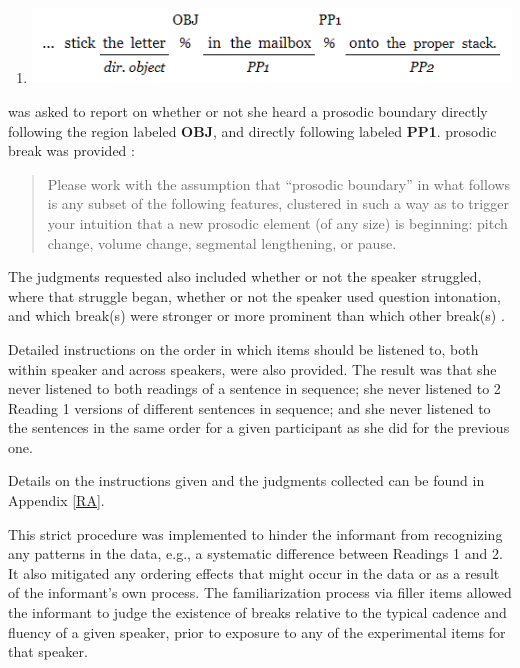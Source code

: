 \documentclass[12pt,oneside]{book}
\providecommand{\tightlist}{%
  \setlength{\itemsep}{0pt}\setlength{\parskip}{0pt}}
\begin{document}
\begin{enumerate}
\def\labelenumi{(\arabic{enumi})}
\setcounter{enumi}{46}
\tightlist
\item
  \includegraphics{breakpos.png}
\end{enumerate}

 was asked to report on whether or not she heard a prosodic boundary directly following the region labeled \textbf{OBJ}, and directly  following  labeled \textbf{PP1}.  prosodic break was provided :

\begin{quote}
Please work with the assumption that ``prosodic boundary'' in what follows is any subset of the following features, clustered in such a way as to trigger your intuition that a new prosodic element (of any size) is beginning: pitch change, volume change, segmental lengthening, or pause.
\end{quote}

The judgments requested also included whether or not the speaker struggled, where that struggle began, whether or not the speaker used question intonation, and which break(s) were stronger or more prominent than which other break(s) .

Detailed instructions on the order in which items should be listened to, both within speaker and across speakers, were also provided. The result was that she never listened to both readings of a sentence in sequence; she never listened to 2 Reading 1 versions of different sentences in sequence; and she never listened to the sentences in the same order for a given participant as she did for the previous one.

Details on the instructions given and the judgments collected can be found in Appendix \ref{RA}.

This strict procedure was implemented to hinder the informant from recognizing any patterns in the data, e.g., a systematic difference between Readings 1 and 2. It also mitigated any ordering effects that might occur in the data or as a result of the informant's own process. The familiarization process via filler items allowed the informant to judge the existence of breaks relative to the typical cadence and fluency of a given speaker, prior to exposure to any of the experimental items for that speaker.
\end{document}
